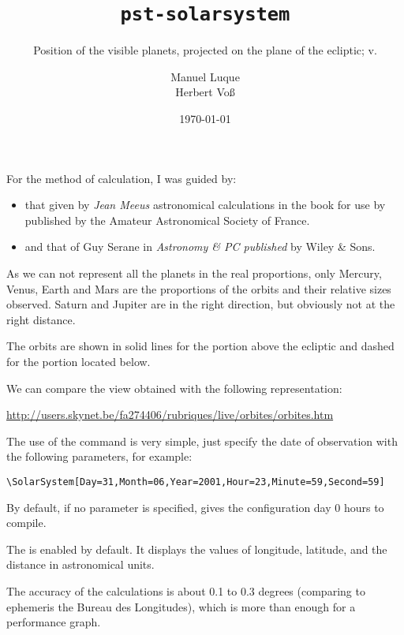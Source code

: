 \documentclass[11pt,english,BCOR10mm,DIV12,bibliography=totoc,parskip=false,
   smallheadings, headexclude,footexclude,oneside]{pst-doc}
\let\pstFV\fileversion
\begin{document}
\title{\texttt{pst-solarsystem}}
\subtitle{Position of the visible planets, projected on the plane of the ecliptic; v.\pstFV}
\author{Manuel Luque \\Herbert Vo\ss}
\docauthor{}
\date{\today}
\maketitle

\tableofcontents

\vspace{2cm}
For the method of calculation, I was guided by:
\begin{itemize}
\item that given by \textit{Jean Meeus} astronomical calculations in the book for use by
published by the Amateur Astronomical Society of France.
\item and that of Guy Serane in \textit{Astronomy \& PC published} by Wiley \& Sons.
\end{itemize}

As we can not represent all the planets in the real proportions, only Mercury, Venus, Earth and Mars are the proportions of the orbits and
their relative sizes observed. Saturn and Jupiter are in the right direction, but
obviously not at the right distance.

The orbits are shown in solid lines for the portion above the ecliptic
and dashed for the portion located below.

We can compare the view obtained with the following representation:

\url{http://users.skynet.be/fa274406/rubriques/live/orbites/orbites.htm}

The use of the command is very simple, just specify the date of observation
with the following parameters, for example:
\begin{verbatim}
\SolarSystem[Day=31,Month=06,Year=2001,Hour=23,Minute=59,Second=59]
\end{verbatim}

By default, if no parameter is specified,  gives the configuration
day 0 hours to compile.

The  is enabled by default. It displays the values of
longitude, latitude, and the distance in astronomical units.

The accuracy of the calculations is about 0.1 to 0.3 degrees (comparing to ephemeris
the Bureau des Longitudes), which is more than enough for a performance
graph.
\end{document}
